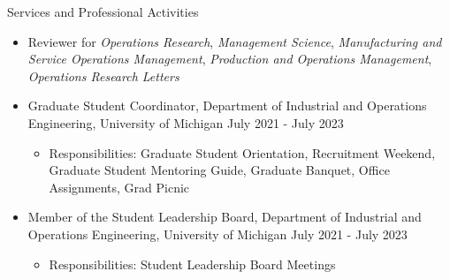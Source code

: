 \documentclass{resume}
\begin{document}
\begin{rSection}{Services and Professional Activities} 
\begin{itemize}
  \item Reviewer for \textit{Operations Research}, \textit{Management Science}, \textit{Manufacturing and Service Operations Management}, \textit{Production and Operations Management}, \textit{Operations Research Letters}
    \item Graduate Student Coordinator, Department of Industrial and Operations Engineering, University of Michigan \hfill July 2021 - July 2023
    \begin{itemize}
      \item Responsibilities: Graduate Student Orientation, Recruitment Weekend, Graduate Student Mentoring Guide, Graduate Banquet, Office Assignments, Grad Picnic
  \end{itemize}
    \item Member of the Student Leadership Board, Department of Industrial and Operations Engineering, University of Michigan \hfill July 2021 - July 2023
    \begin{itemize}
      \item Responsibilities: Student Leadership Board Meetings
  \end{itemize}
    
\end{itemize}
\end{rSection}

\end{document}
